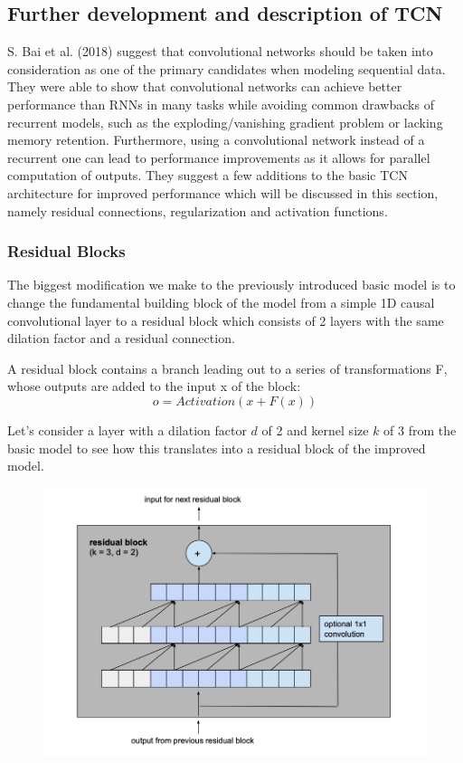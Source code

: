 \subsection{Further development and description of TCN}
S. Bai et al. (2018) suggest that convolutional networks should be taken into consideration as one of the primary candidates when modeling sequential data. They were able to show that convolutional networks can achieve better performance than RNNs in many tasks while avoiding common drawbacks of recurrent models, such as the exploding/vanishing gradient problem or lacking memory retention. Furthermore, using a convolutional network instead of a recurrent one can lead to performance improvements as it allows for parallel computation of outputs. They suggest a few additions to the basic TCN architecture for improved performance which will be discussed in this section, namely residual connections, regularization and activation functions.

\subsubsection{Residual Blocks}
The biggest modification we make to the previously introduced basic model is to change the fundamental building block of the model from a simple 1D causal convolutional layer to a residual block which consists of 2 layers with the same dilation factor and a residual connection.

A residual block contains a branch leading out to a series of transformations F, whose outputs are added to the input x of the block: $$o=Activation(x+F(x))$$

Let’s consider a layer with a dilation factor $d$ of 2 and kernel size $k$ of 3 from the basic model to see how this translates into a residual block of the improved model.
\begin{figure}[h]
    \includegraphics[width=\textwidth]{../Figures/ch3_3.png}
\end{figure}

